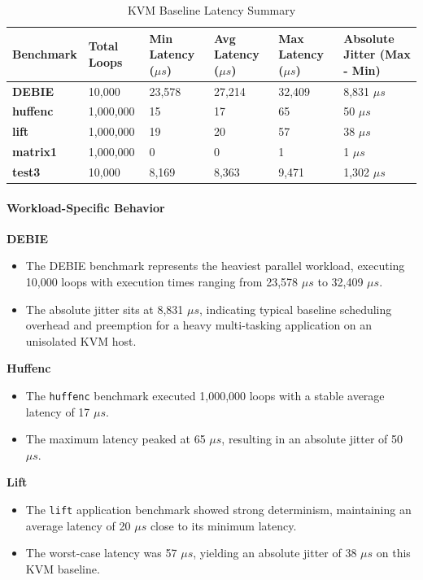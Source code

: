 \begin{table}
\centering
\caption{KVM Baseline Latency Summary}
\label{tab:kvm:baseline}
\begin{tabularx}{\linewidth}{@{}YYYYYY@{}}
\toprule
Benchmark & Total Loops & Min Latency ($\mu s$) & Avg Latency ($\mu s$) & Max Latency ($\mu s$) & Absolute Jitter (Max - Min)\tabularnewline
\midrule
\textbf{DEBIE} & 10,000 & 23,578 & 27,214 & 32,409 & 8,831 $\mu s$\tabularnewline
\textbf{huffenc} & 1,000,000 & 15 & 17 & 65 & 50 $\mu s$\tabularnewline
\textbf{lift} & 1,000,000 & 19 & 20 & 57 & 38 $\mu s$\tabularnewline
\textbf{matrix1} & 1,000,000 & 0 & 0 & 1 & 1 $\mu s$\tabularnewline
\textbf{test3} & 10,000 & 8,169 & 8,363 & 9,471 & 1,302 $\mu s$\tabularnewline
\bottomrule
\end{tabularx}
\end{table}

\paragraph{Workload-Specific
Behavior}\label{workload-specific-behavior}

\textbf{DEBIE}

\begin{itemize}
\item
  The DEBIE benchmark represents the heaviest parallel workload,
  executing 10,000 loops with execution times ranging from 23,578 $\mu s$ to
  32,409 $\mu s$.
\item
  The absolute jitter sits at 8,831 $\mu s$, indicating typical baseline
  scheduling overhead and preemption for a heavy multi-tasking
  application on an unisolated KVM host.
\end{itemize}

\textbf{Huffenc}

\begin{itemize}
\item
  The \texttt{huffenc} benchmark executed 1,000,000 loops with a stable
  average latency of 17 $\mu s$.
\item
  The maximum latency peaked at 65 $\mu s$, resulting in an absolute jitter
  of 50 $\mu s$.
\end{itemize}

\textbf{Lift}

\begin{itemize}
\item
  The \texttt{lift} application benchmark showed strong determinism,
  maintaining an average latency of 20 $\mu s$ close to its minimum latency.
\item
  The worst-case latency was 57 $\mu s$, yielding an absolute jitter of 38 $\mu s$
  on this KVM baseline.
\end{itemize}

